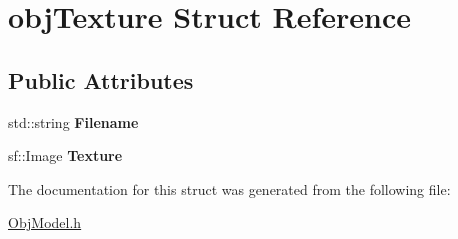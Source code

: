 \hypertarget{structobj_texture}{}\section{obj\+Texture Struct Reference}
\label{structobj_texture}
\subsection*{Public Attributes}
\begin{DoxyCompactItemize}
\item 
\mbox{\label{structobj_texture_a7c4da165063cb27e1f2cb4f4d5c1fb0c}} 
std\+::string {\bfseries Filename}
\item 
\mbox{\label{structobj_texture_a8c306dd42c8784f539c49fa55be96d41}} 
sf\+::\+Image {\bfseries Texture}
\end{DoxyCompactItemize}


The documentation for this struct was generated from the following file\+:\begin{DoxyCompactItemize}
\item 
\hyperlink{_obj_model_8h}{Obj\+Model.\+h}\end{DoxyCompactItemize}
